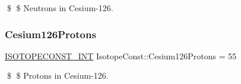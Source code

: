 \$ \$ Neutrons in Cesium-\/126. \mbox{\label{group___isotope_const-_cesium-_cs126_ga1f24328dda3fca70eee88e8f9421beb1}} 
\subsubsection{\texorpdfstring{Cesium126\+Protons}{Cesium126Protons}}
{\footnotesize\ttfamily \mbox{\hyperlink{group___isotope_const-_macros_ga5f18360b3e99483a35c32d789e62621c}{I\+S\+O\+T\+O\+P\+E\+C\+O\+N\+S\+T\+\_\+\+I\+NT}} Isotope\+Const\+::\+Cesium126\+Protons = 55}

\$ \$ Protons in Cesium-\/126. 